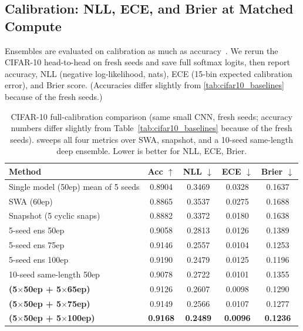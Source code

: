 \subsection{Calibration: NLL, ECE, and Brier at Matched Compute}
\label{sec:calib}

Ensembles are evaluated on calibration as much as
accuracy~\cite{ashukha2020pitfalls}. We rerun the CIFAR-10 head-to-head
on fresh seeds and save full softmax logits, then report accuracy, NLL
(negative log-likelihood, nats), ECE (15-bin expected calibration
error), and Brier score. (Accuracies differ slightly from
\cref{tab:cifar10_baselines} because of the fresh seeds.)

\begin{table}[h]
\centering
\caption{CIFAR-10 full-calibration comparison (same small CNN, fresh
seeds; accuracy numbers differ slightly from Table~\ref{tab:cifar10_baselines}
because of the fresh seeds). \ours{} sweeps all four metrics over SWA,
snapshot, and a 10-seed same-length deep ensemble. Lower is better for
NLL, ECE, Brier.}
\label{tab:cifar10_calib}
\begin{tabular}{lcccc}
\toprule
Method & Acc $\uparrow$ & NLL $\downarrow$ & ECE $\downarrow$ & Brier $\downarrow$ \\
\midrule
Single model (50ep) mean of 5 seeds & 0.8904 & 0.3469 & 0.0328 & 0.1637 \\
SWA (60ep)                          & 0.8865 & 0.3537 & 0.0275 & 0.1688 \\
Snapshot (5 cyclic snaps)           & 0.8882 & 0.3372 & 0.0180 & 0.1638 \\
5-seed ens 50ep                     & 0.9058 & 0.2813 & 0.0126 & 0.1389 \\
5-seed ens 75ep                     & 0.9146 & 0.2557 & 0.0104 & 0.1253 \\
5-seed ens 100ep                    & 0.9190 & 0.2479 & 0.0125 & 0.1196 \\
10-seed same-length 50ep            & 0.9078 & 0.2722 & 0.0101 & 0.1355 \\
\rowcolor{blond}
\textbf{\ours{} (5$\times$50ep + 5$\times$65ep)}   & 0.9126 & 0.2607 & 0.0098 & 0.1290 \\
\rowcolor{blond}
\textbf{\ours{} (5$\times$50ep + 5$\times$75ep)}   & 0.9149 & 0.2566 & 0.0107 & 0.1277 \\
\rowcolor{blond}
\textbf{\ours{} (5$\times$50ep + 5$\times$100ep)}  & \textbf{0.9168} & \textbf{0.2489} & \textbf{0.0096} & \textbf{0.1236} \\
\bottomrule
\end{tabular}
\end{table}

